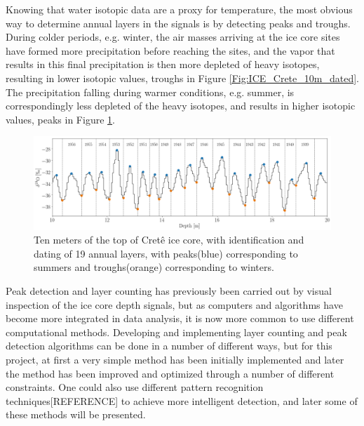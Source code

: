 \documentclass[../../CompleteThesis2/Complete_2ndDraft]{subfiles}
\begin{document}
Knowing that water isotopic data are a proxy for temperature, the most obvious way to determine annual layers in the signals is by detecting peaks and troughs. During colder periods, e.g. winter, the air masses arriving at the ice core sites have formed more precipitation before reaching the sites, and the vapor that results in this final precipitation is then more depleted of heavy isotopes, resulting in lower isotopic values, troughs in Figure \ref{Fig:ICE_Crete_10m_dated}. The precipitation falling during warmer conditions, e.g. summer, is correspondingly less depleted of the heavy isotopes, and results in higher isotopic values, peaks in Figure \ref{Fig:COMPMETH_Crete_10m_PeaksTroughs}.
\begin{figure}[h]
	\centering
	\includegraphics[width=\textwidth]{Crete_10m_PeaksTroughs.png}
	\caption[10 m of Crête core with peaks and troughs.]{\small Ten meters of the top of Cretê ice core, with identification and dating of 19 annual layers, with peaks(blue) corresponding to summers and troughs(orange) corresponding to winters.}
	\label{Fig:COMPMETH_Crete_10m_PeaksTroughs}
\end{figure}

Peak detection and layer counting has previously been carried out by visual inspection of the ice core depth signals, but as computers and algorithms have become more integrated in data analysis, it is now more common to use different computational methods. Developing and implementing layer counting and peak detection algorithms can be done in a number of different ways, but for this project, at first a very simple method has been initially implemented and later the method has been improved and optimized through a number of different constraints. One could also use different pattern recognition techniques[REFERENCE] to achieve more intelligent detection, and later some of these methods will be presented.
\end{document}
